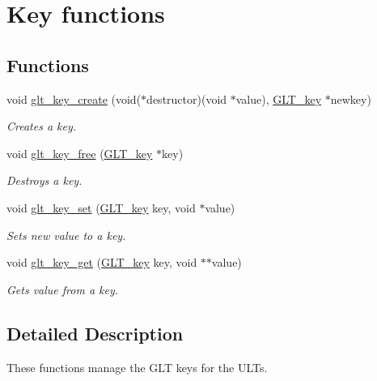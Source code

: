 \hypertarget{group__KEY}{\section{Key functions}
\label{group__KEY}
}
\subsection*{Functions}
\begin{DoxyCompactItemize}
\item 
void \hyperlink{group__KEY_gacadf8a24eb507018200042230da3e2b2}{glt\-\_\-key\-\_\-create} (void($\ast$destructor)(void $\ast$value), \hyperlink{group__OBJECTS_ga3fb7b155abd017c450efc283b3d6666b}{G\-L\-T\-\_\-key} $\ast$newkey)
\begin{DoxyCompactList}\small\item\em Creates a key. \end{DoxyCompactList}\item 
void \hyperlink{group__KEY_ga36e5411473e454c0e7ae82992f9dfcbf}{glt\-\_\-key\-\_\-free} (\hyperlink{group__OBJECTS_ga3fb7b155abd017c450efc283b3d6666b}{G\-L\-T\-\_\-key} $\ast$key)
\begin{DoxyCompactList}\small\item\em Destroys a key. \end{DoxyCompactList}\item 
void \hyperlink{group__KEY_gaaa5f2bd888a6cd8d8c811bf4a02c9f3f}{glt\-\_\-key\-\_\-set} (\hyperlink{group__OBJECTS_ga3fb7b155abd017c450efc283b3d6666b}{G\-L\-T\-\_\-key} key, void $\ast$value)
\begin{DoxyCompactList}\small\item\em Sets new value to a key. \end{DoxyCompactList}\item 
void \hyperlink{group__KEY_ga2a3c3de9cfc563501468c2f2aa6cf734}{glt\-\_\-key\-\_\-get} (\hyperlink{group__OBJECTS_ga3fb7b155abd017c450efc283b3d6666b}{G\-L\-T\-\_\-key} key, void $\ast$$\ast$value)
\begin{DoxyCompactList}\small\item\em Gets value from a key. \end{DoxyCompactList}\end{DoxyCompactItemize}


\subsection{Detailed Description}
These functions manage the G\-L\-T keys for the U\-L\-Ts. 


